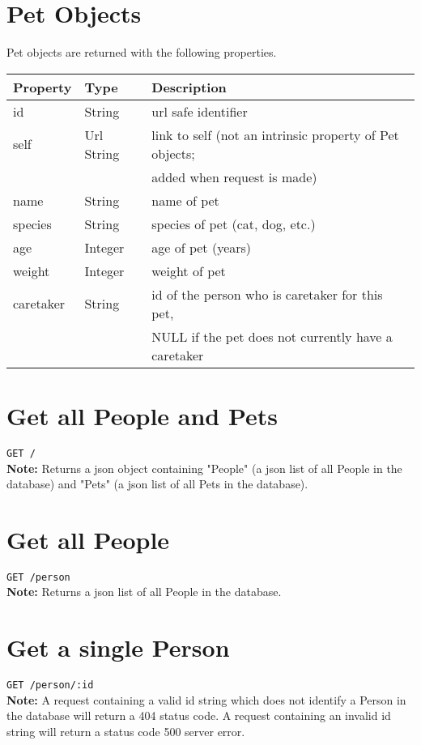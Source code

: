 \documentclass{article}
\begin{document}
\section*{Pet Objects}
Pet objects are returned with the following properties. \\
\begin{tabular}{| l | l | l |}
	\hline
	\textbf{Property}     & \textbf{Type}   & \textbf{Description} \\
	\hline
	id                    & String          & url safe identifier \\
	\hline
	self                  & Url String      & link to self (not an intrinsic property of Pet objects; \\
	                      &                 & added when request is made) \\
	\hline
	name		      & String          & name of pet \\
	\hline
	species               & String          & species of pet (cat, dog, etc.) \\
	\hline
	age                   & Integer	        & age of pet (years) \\
	\hline
	weight                & Integer         & weight of pet \\
	\hline
	caretaker             & String          & id of the person who is caretaker for this pet, \\
	                      &                 & NULL if the pet does not currently have a caretaker \\
	\hline
\end{tabular}

\section*{Get all People and Pets}
\texttt{GET /} \\
\textbf{Note:} Returns a json object containing "People" (a json list of all People in the
database) and "Pets" (a json list of all Pets in the database).

\section*{Get all People}
\texttt{GET /person} \\
\textbf{Note:} Returns a json list of all People in the database.

\section*{Get a single Person}
\texttt{GET /person/:id} \\
\textbf{Note:} A request containing a valid id string which does not
identify a Person in the database will return a 404 status code. A request
containing an invalid id string will return a status code 500 server error.
\end{document}
